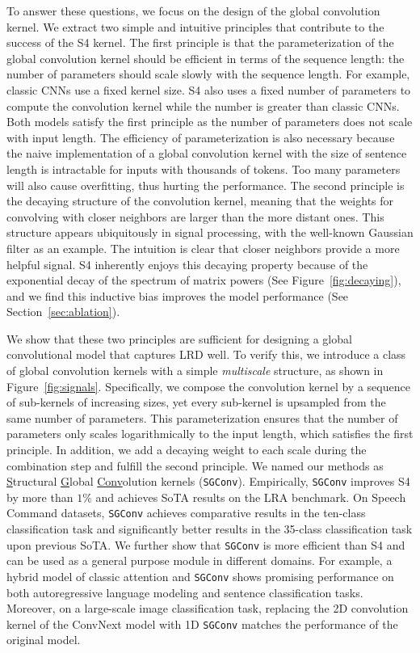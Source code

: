To answer these questions, we focus on the design of the global convolution kernel. We extract two simple and intuitive principles that contribute to the success of the S4 kernel. The first principle is that the parameterization of the global convolution kernel should be efficient in terms of the sequence length: the number of parameters should scale slowly with the sequence length. For example, classic CNNs use a fixed kernel size. S4 also uses a fixed number of parameters to compute the convolution kernel while the number is greater than classic CNNs. Both models satisfy the first principle as the number of parameters does not scale with input length. The efficiency of parameterization is also necessary because the naive implementation of a global convolution kernel with the size of sentence length is intractable for inputs with thousands of tokens. Too many parameters will also cause overfitting, thus hurting the performance. The second principle is the decaying structure of the convolution kernel, meaning that the weights for convolving with closer neighbors are larger than the more distant ones. This structure appears ubiquitously in signal processing, with the well-known Gaussian filter as an example. The intuition is clear that closer neighbors provide a more helpful signal. S4 inherently enjoys this decaying property because of the exponential decay of the spectrum of matrix powers (See Figure~\ref{fig:decaying}), and we find this inductive bias improves the model performance (See Section~\ref{sec:ablation}). 

We show that these two principles are sufficient for designing a global convolutional model that captures LRD well. To verify this, we introduce a class of global convolution kernels with a simple \emph{multiscale} structure, as shown in Figure~\ref{fig:signals}. Specifically, we compose the convolution kernel by a sequence of sub-kernels of increasing sizes, yet every sub-kernel is upsampled from the same number of parameters. This parameterization ensures that the number of parameters only scales logarithmically to the input length, which satisfies the first principle. In addition, we add a decaying weight to each scale during the combination step and fulfill the second principle. We named our methods as \underline{S}tructural \underline{G}lobal \underline{Conv}olution kernels (\texttt{SGConv}). 
Empirically, \texttt{SGConv} improves S4 by more than $1\%$ and achieves SoTA results on the LRA benchmark. On Speech Command datasets, \texttt{SGConv} achieves comparative results in the ten-class classification task and significantly better results in the 35-class classification task upon previous SoTA. We further show that \texttt{SGConv} is more efficient than S4 and can be used as a general purpose module in different domains. For example, a hybrid model of classic attention and \texttt{SGConv} shows promising performance on both autoregressive language modeling and sentence classification tasks. Moreover, on a large-scale image classification task, replacing the 2D convolution kernel of the ConvNext model with 1D \texttt{SGConv} matches the performance of the original model.

